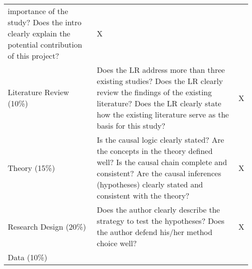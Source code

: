 \documentclass[11pt,]{article}
\theoremstyle{definition}
\theoremstyle{definition}
\theoremstyle{definition}
\theoremstyle{remark}
\begin{document}
\begin{longtable}[]{@{}lll@{}}
\begin{minipage}[t]{0.76\columnwidth}
importance of the study? Does the intro clearly explain the potential
contribution of this project?\strut
\end{minipage} & \begin{minipage}[t]{0.03\columnwidth}\raggedright\strut
X\strut
\end{minipage}\tabularnewline
\begin{minipage}[t]{0.12\columnwidth}\raggedright\strut
Literature Review (10\%)\strut
\end{minipage} & \begin{minipage}[t]{0.76\columnwidth}\raggedright\strut
Does the LR address more than three existing studies? Does the LR
clearly review the findings of the existing literature? Does the LR
clearly state how the existing literature serve as the basis for this
study?\strut
\end{minipage} & \begin{minipage}[t]{0.03\columnwidth}\raggedright\strut
X\strut
\end{minipage}\tabularnewline
\begin{minipage}[t]{0.12\columnwidth}\raggedright\strut
Theory (15\%)\strut
\end{minipage} & \begin{minipage}[t]{0.76\columnwidth}\raggedright\strut
Is the causal logic clearly stated? Are the concepts in the theory
defined well? Is the causal chain complete and consistent? Are the
causal inferences (hypotheses) clearly stated and consistent with the
theory?\strut
\end{minipage} & \begin{minipage}[t]{0.03\columnwidth}\raggedright\strut
X\strut
\end{minipage}\tabularnewline
\begin{minipage}[t]{0.12\columnwidth}\raggedright\strut
Research Design (20\%)\strut
\end{minipage} & \begin{minipage}[t]{0.76\columnwidth}\raggedright\strut
Does the author clearly describe the strategy to test the hypotheses?
Does the author defend his/her method choice well?\strut
\end{minipage} & \begin{minipage}[t]{0.03\columnwidth}\raggedright\strut
X\strut
\end{minipage}\tabularnewline
\begin{minipage}[t]{0.12\columnwidth}\raggedright\strut
Data (10\%)\strut
\end{minipage} & \begin{minipage}[t]{0.76\columnwidth}\raggedright\strut

\end{minipage}
\end{longtable}
\end{document}
